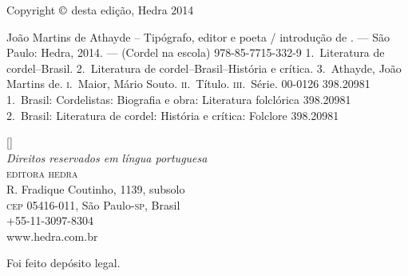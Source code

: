 
\clearpage

\begingroup
\centering
\footnotesize

Copyright $\copyright$ desta edição, Hedra 2014\\\medskip

%
%
%

%

%
{João Martins de Athayde -- Tipógrafo, editor e poeta / introdução de \introdutor. --- São Paulo: Hedra, 2014. --- (Cordel na escola)}
{978-85-7715-332-9}%
{1.~Literatura de cordel--Brasil. 2.~Literatura de
cordel--Brasil--História e crítica. 3.~Athayde, João Martins de.
\textsc{i}.~Maior, Mário Souto. \textsc{ii}.~Título.
\textsc{iii}.~Série.}%
{00-0126}%
{398.20981}%
{1.~Brasil: Cordelistas: Biografia e obra: Literatura folclórica 398.20981\\
2.~Brasil: Literatura de cordel: História e crítica: Folclore 398.20981}

\vfill

[\the\year]\\
\textit{Direitos reservados em língua portuguesa}\\
\textsc{editora hedra}\\
R. Fradique Coutinho, 1139, subsolo\\
\textsc{cep} 05416-011,  São Paulo-\textsc{sp}, Brasil\\
+55-11-3097-8304\\ 
www.hedra.com.br\\\smallskip

Foi feito depósito legal.

\par
\endgroup
\clearpage
